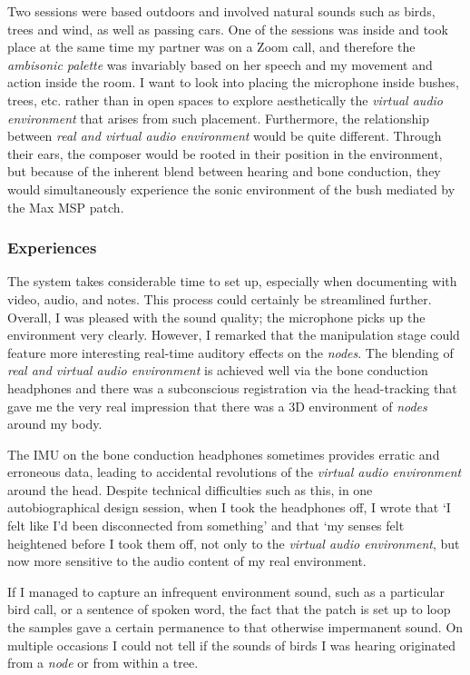 Two sessions were based outdoors and involved natural sounds such as birds, trees and wind, as well as passing cars. One of the sessions was inside and took place at the same time my partner was on a Zoom call, and therefore the \textit{ambisonic palette} was invariably based on her speech and my movement and action inside the room. I want to look into placing the microphone inside bushes, trees, etc. rather than in open spaces to explore aesthetically the \textit{virtual audio environment} that arises from such placement. Furthermore, the relationship between \textit{real and virtual audio environment} would be quite different. Through their ears, the composer would be rooted in their position in the environment, but because of the inherent blend between hearing and bone conduction, they would simultaneously experience the sonic environment of the bush mediated by the Max MSP patch.

\subsubsection{Experiences}\label{sec: area-study-results-experiences}
The system takes considerable time to set up, especially when documenting with video, audio, and notes. This process could certainly be streamlined further. Overall, I was pleased with the sound quality; the microphone picks up the environment very clearly. However, I remarked that the manipulation stage could feature more interesting real-time auditory effects on the \textit{nodes}. The blending of \textit{real and virtual audio environment} is achieved well via the bone conduction headphones and there was a subconscious registration via the head-tracking that gave me the very real impression that there was a 3D environment of \textit{nodes} around my body.

The IMU on the bone conduction headphones sometimes provides erratic and erroneous data, leading to accidental revolutions of the \textit{virtual audio environment} around the head. Despite technical difficulties such as this, in one autobiographical design session, when I took the headphones off, I wrote that `I felt like I'd been disconnected from something' and that `my senses felt heightened before I took them off, not only to the \textit{virtual audio environment}, but now more sensitive to the audio content of my real environment.

If I managed to capture an infrequent environment sound, such as a particular bird call, or a sentence of spoken word, the fact that the patch is set up to loop the samples gave a certain permanence to that otherwise impermanent sound. On multiple occasions I could not tell if the sounds of birds I was hearing originated from a \textit{node} or from within a tree.

